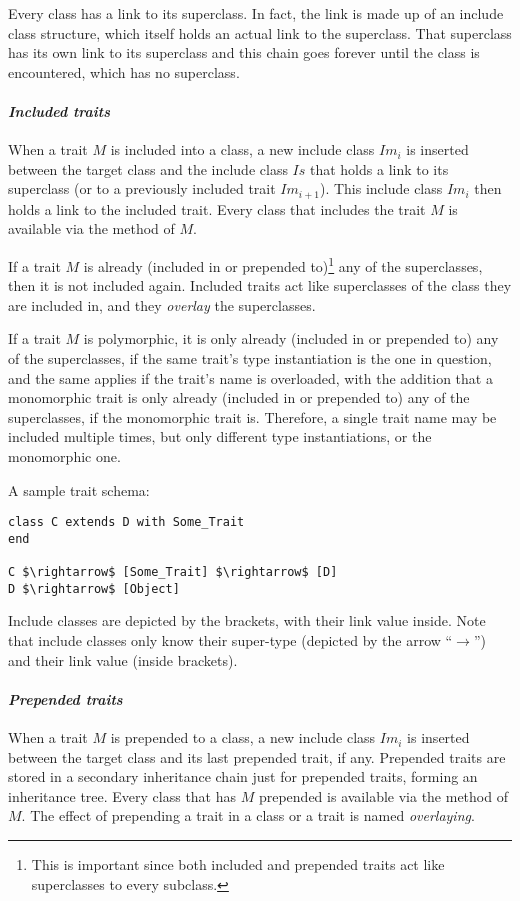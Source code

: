 Every class has a link to its superclass. In fact, the link is made up of an include class structure, which itself holds an actual link to the superclass. That superclass has its own link to its superclass and this chain goes forever until the  class is encountered, which has no superclass. 

\paragraph{\em Included traits}
When a trait $M$ is included into a class, a new include class $Im_i$ is inserted between the target class and the include class $Is$ that holds a link to its superclass (or to a previously included trait $Im_{i+1}$). This include class $Im_i$ then holds a link to the included trait. Every class that includes the trait $M$ is available via the  method of $M$. 

If a trait $M$ is already (included in or prepended to)\footnote{This is important since both included and prepended traits act like superclasses to every subclass.} any of the superclasses, then it is not included again. Included traits act like superclasses of the class they are included in, and they {\em overlay} the superclasses. 

If a trait $M$ is polymorphic, it is only already (included in or prepended to) any of the superclasses, if the same trait's type instantiation is the one in question, and the same applies if the trait's name is overloaded, with the addition that a monomorphic trait is only already (included in or prepended to) any of the superclasses, if the monomorphic trait is. Therefore, a single trait name may be included multiple times, but only different type instantiations, or the monomorphic one. 

\example A sample trait schema:
\begin{lstlisting}
class C extends D with Some_Trait
end

C $\rightarrow$ [Some_Trait] $\rightarrow$ [D]
D $\rightarrow$ [Object]
\end{lstlisting}
Include classes are depicted by the brackets, with their link value inside. Note that include classes only know their super-type (depicted by the arrow ``$\rightarrow$'') and their link value (inside brackets). 

\paragraph{\em Prepended traits}
When a trait $M$ is prepended to a class, a new include class $Im_i$ is inserted between the target class and its last prepended trait, if any. Prepended traits are stored in a secondary inheritance chain just for prepended traits, forming an inheritance tree. Every class that has $M$ prepended is available via the  method of $M$. The effect of prepending a trait in a class or a trait is named {\em overlaying}. 

